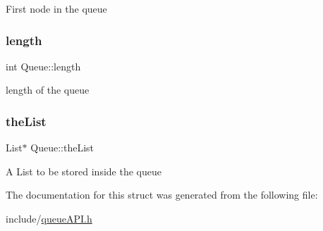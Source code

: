 First node in the queue \mbox{\label{structQueue_a72159731344d08720fbb96bc482b9c10}} 
\subsubsection{\texorpdfstring{length}{length}}
{\footnotesize\ttfamily int Queue\+::length}

length of the queue \mbox{\label{structQueue_a10b93f38cf61fc10d4bd49942eb475f1}} 
\subsubsection{\texorpdfstring{the\+List}{theList}}
{\footnotesize\ttfamily List$\ast$ Queue\+::the\+List}

A List to be stored inside the queue 

The documentation for this struct was generated from the following file\+:\begin{DoxyCompactItemize}
\item 
include/\hyperlink{queueAPI_8h}{queue\+A\+P\+I.\+h}\end{DoxyCompactItemize}
